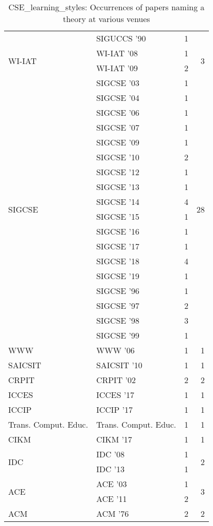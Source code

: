 \begin{table*}[t]
\begin{tabular}{llrr}
& SIGUCCS '90 & 1 &\\
\multirow{2}{*}{WI-IAT } & WI-IAT '08 & 1 & \multirow{2}{*}{3}\\
& WI-IAT '09 & 2 &\\
\multirow{18}{*}{SIGCSE } & SIGCSE '03 & 1 & \multirow{18}{*}{28}\\
& SIGCSE '04 & 1 &\\
& SIGCSE '06 & 1 &\\
& SIGCSE '07 & 1 &\\
& SIGCSE '09 & 1 &\\
& SIGCSE '10 & 2 &\\
& SIGCSE '12 & 1 &\\
& SIGCSE '13 & 1 &\\
& SIGCSE '14 & 4 &\\
& SIGCSE '15 & 1 &\\
& SIGCSE '16 & 1 &\\
& SIGCSE '17 & 1 &\\
& SIGCSE '18 & 4 &\\
& SIGCSE '19 & 1 &\\
& SIGCSE '96 & 1 &\\
& SIGCSE '97 & 2 &\\
& SIGCSE '98 & 3 &\\
& SIGCSE '99 & 1 &\\
\multirow{1}{*}{WWW } & WWW '06 & 1 & \multirow{1}{*}{1}\\
\multirow{1}{*}{SAICSIT } & SAICSIT '10 & 1 & \multirow{1}{*}{1}\\
\multirow{1}{*}{CRPIT } & CRPIT '02 & 2 & \multirow{1}{*}{2}\\
\multirow{1}{*}{ICCES } & ICCES '17 & 1 & \multirow{1}{*}{1}\\
\multirow{1}{*}{ICCIP } & ICCIP '17 & 1 & \multirow{1}{*}{1}\\
\multirow{1}{*}{Trans. Comput. Educ.} & Trans. Comput. Educ. & 1 & \multirow{1}{*}{1}\\
\multirow{1}{*}{CIKM } & CIKM '17 & 1 & \multirow{1}{*}{1}\\
\multirow{2}{*}{IDC } & IDC '08 & 1 & \multirow{2}{*}{2}\\
& IDC '13 & 1 &\\
\multirow{2}{*}{ACE } & ACE '03 & 1 & \multirow{2}{*}{3}\\
& ACE '11 & 2 &\\
\multirow{1}{*}{ACM } & ACM '76 & 2 & \multirow{1}{*}{2}\\
\end{tabular}
\caption{CSE\_learning\_styles: Occurrences of papers naming a theory at various venues}
\end{table*}